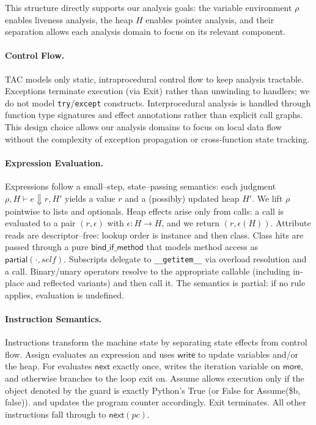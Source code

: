 This structure directly supports our analysis goals: the variable environment $\rho$ enables liveness analysis, the heap $H$ enables pointer analysis, and their separation allows each analysis domain to focus on its relevant component.

\paragraph{Control Flow.}
TAC models only static, intraprocedural control flow to keep analysis tractable. Exceptions terminate execution (via \textsf{Exit}) rather than unwinding to handlers; we do not model \texttt{try}/\texttt{except} constructs. Interprocedural analysis is handled through function type signatures and effect annotations rather than explicit call graphs. This design choice allows our analysis domains to focus on local data flow without the complexity of exception propagation or cross-function state tracking.

\paragraph{Expression Evaluation.}
Expressions follow a small–step, state–passing semantics: each judgment
\(\rho,H \vdash e \Downarrow r,H'\) yields a value \(r\) and a (possibly) updated heap \(H'\). We lift \(\rho\) pointwise to lists and
optionals. Heap effects arise only from calls: a call is evaluated to a pair
\((r,\epsilon)\) with \(\epsilon: H \to H\), and we return \((r,\epsilon(H))\).
Attribute reads are descriptor–free: lookup order is instance and then class. Class hits are passed through a pure
\(\mathsf{bind\_if\_method}\) that models method access as \(\mathsf{partial}(\cdot,\mathit{self})\).
Subscripts delegate to \texttt{\_\_getitem\_\_} via overload resolution and a call.
Binary/unary operators resolve to the appropriate callable (including in-place and
reflected variants) and then call it. The semantics is partial: if no rule applies,  evaluation is undefined.

\paragraph{Instruction Semantics.}
Instructions transform the machine state by separating state effects from control flow.
\textsf{Assign} evaluates an expression and uses \(\mathsf{write}\) to update variables
and/or the heap. \textsf{For} evaluates \(\mathsf{next}\) exactly once, writes the
iteration variable on \(\mathsf{more}\), and otherwise branches to the loop exit on. \textsf{Assume} allows execution only if the object denoted by the guard is exactly Python's True (or False for \textsf{Assume}(\$b, false)).
and updates the program counter accordingly. \textsf{Exit} terminates. All other
instructions fall through to \(\mathsf{next}(pc)\).
